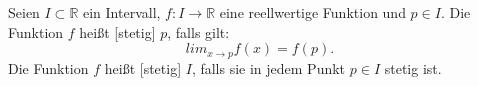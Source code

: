 Seien $I \subset \mathbb{R}$ ein Intervall, $f : I \to \mathbb{R}$ eine reellwertige Funktion und $p \in I$. Die Funktion $f$ heißt
[stetig] $p$, falls gilt: 
$$lim_{x \to p} f(x) = f(p).$$
Die Funktion $f$ heißt [stetig] $I$, falls sie in jedem Punkt $p \in I$ stetig ist.